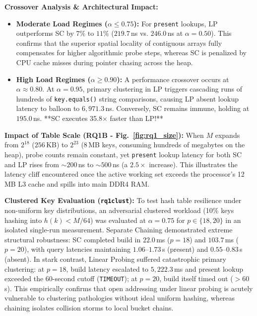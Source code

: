 \documentclass[twocolumn, 10pt, a4paper]{article}
\begin{document}
\textbf{Crossover Analysis \& Architectural Impact:}
\begin{itemize}
    \item \textbf{Moderate Load Regimes ($\alpha \le 0.75$):} For \texttt{present} lookups, LP outperforms SC by $7\%$ to $11\%$ ($219.7$\,ns vs. $246.0$\,ns at $\alpha=0.50$). This confirms that the superior spatial locality of contiguous arrays fully compensates for higher algorithmic probe steps, whereas SC is penalized by CPU cache misses during pointer chasing across the heap.
    \item \textbf{High Load Regimes ($\alpha \ge 0.90$):} A performance crossover occurs at $\alpha \approx 0.80$. At $\alpha=0.95$, primary clustering in LP triggers cascading runs of hundreds of \texttt{key.equals()} string comparisons, causing LP absent lookup latency to balloon to $6,971.3$\,ns. Conversely, SC remains immune, holding at $195.0$\,ns. **SC executes 35.8$\times$ faster than LP!**
\end{itemize}

\textbf{Impact of Table Scale (RQ1B - Fig.~\ref{fig:rq1_size}):} When $M$ expands from $2^{18}$ ($256$\,KB) to $2^{23}$ ($8$\,MB keys, consuming hundreds of megabytes on the heap), probe counts remain constant, yet \texttt{present} lookup latency for both SC and LP rises from $\sim 200$\,ns to $\sim 500$\,ns (a $2.5\times$ increase). This illustrates the latency cliff encountered once the active working set exceeds the processor's 12\,MB L3 cache and spills into main DDR4 RAM.

\textbf{Clustered Key Evaluation (\texttt{rq1clust}):} To test hash table resilience under non-uniform key distributions, an adversarial clustered workload (10\% keys hashing into $h(k) < M/64$) was evaluated at $\alpha = 0.75$ for $p \in \{18, 20\}$ in an isolated single-run measurement. Separate Chaining demonstrated extreme structural robustness: SC completed build in $22.0$\,ms ($p=18$) and $103.7$\,ms ($p=20$), with query latencies maintaining $1.06$--$1.73$\,s (present) and $0.55$--$0.83$\,s (absent). In stark contrast, Linear Probing suffered catastrophic primary clustering: at $p=18$, build latency escalated to $5,222.3$\,ms and present lookup exceeded the 60-second cutoff (\texttt{TIMEOUT}); at $p=20$, build itself timed out ($>60$\,s). This empirically confirms that open addressing under linear probing is acutely vulnerable to clustering pathologies without ideal uniform hashing, whereas chaining isolates collision storms to local bucket chains.
\end{document}
